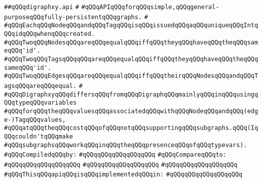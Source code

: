 \label{src/lib/src/digraphxy.api}
\verb|##qQQqdigraphxy.api|\newline
\verb|#|\newline
\verb|#qQQqAPIqQQqforqQQqsimple,qQQqgeneral-purposeqQQqfully-persistentqQQqgraphs.|\newline
\verb|#|\newline
\verb|#qQQqEachqQQqNodeqQQqandqQQqTagqQQqisqQQqissuedqQQqaqQQquniqueqQQqIntqQQqidqQQqwhenqQQqcreated.|\newline
\verb|#qQQqTwoqQQqNodesqQQqareqQQqequalqQQqiffqQQqtheyqQQqhaveqQQqtheqQQqsameqQQq'id'.|\newline
\verb|#qQQqTwoqQQqTagsqQQqqQQqareqQQqequalqQQqiffqQQqtheyqQQqhaveqQQqtheqQQqsameqQQq'id'.|\newline
\verb|#qQQqTwoqQQqEdgesqQQqareqQQqequalqQQqiffqQQqtheirqQQqNodesqQQqandqQQqTagsqQQqareqQQqequal.|\newline
\verb|#|\newline
\verb|#qQQqDigraphxyqQQqdiffersqQQqfromqQQqDigraphqQQqmainlyqQQqinqQQqusingqQQqtypeqQQqvariables|\newline
\verb|#qQQqforqQQqtheqQQqvaluesqQQqassociatedqQQqwithqQQqNodeqQQqandqQQq(edge-)TagqQQqvalues,|\newline
\verb|#qQQqatqQQqtheqQQqcostqQQqofqQQqnotqQQqsupportingqQQqsubgraphs.qQQq(IqQQqcouldn'tqQQqmake|\newline
\verb|#qQQqsubgraphsqQQqworkqQQqinqQQqtheqQQqpresenceqQQqofqQQqtypevars).|\newline
\newline
\verb|#qQQqCompiledqQQqby:|\newline
\verb|#qQQqqQQqqQQqqQQqqQQq|\newline
\newline
\verb|#qQQqCompareqQQqto:|\newline
\verb|#qQQqqQQqqQQqqQQqqQQq|\newline
\verb|#qQQqqQQqqQQqqQQqqQQq|\newline
\verb|#qQQqqQQqqQQqqQQqqQQq|\newline
\newline
\verb|#qQQqThisqQQqapiqQQqisqQQqimplementedqQQqin:|\newline
\verb|#qQQqqQQqqQQqqQQqqQQq|\newline
